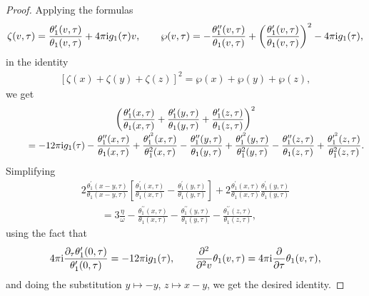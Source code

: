 \documentclass[10pt,a4paper]{amsart}
\numberwithin{equation}{section}
\begin{document}
\begin{proof}
Applying the formulas\vspace{-.5ex}
\begin{gather*}
\zeta(v,\tau)=\frac{\theta_1^{\prime}(v,\tau)}{\theta_1(v,\tau)}+4\pi {\rm i}g_1(\tau)v,\qquad
\wp(v,\tau)=-\frac{\theta_1^{\prime\prime}(v,\tau)}{\theta_1(v,\tau)} +{\left(\frac{\theta_1^{\prime}(v,\tau)}{\theta_1(v,\tau)}\right)}^2-4\pi {\rm i}g_1(\tau),
\end{gather*}
in the identity~\cite{E.T.WhittakerandG.N.Watson}\vspace{-.5ex}
\begin{gather*}
\left[\zeta(x)+\zeta(y)+\zeta(z)\right]^2=\wp(x)+\wp(y)+\wp(z),
\end{gather*}
we get
\begin{gather*}
\left(\frac{\theta_1^{\prime}(x,\tau)}{\theta_1(x,\tau)}+\frac{\theta_1^{\prime}(y,\tau)}{\theta_1(y,\tau)} +\frac{\theta_1^{\prime}(z,\tau)}{\theta_1(z,\tau)}\right)^2
\\[-.5ex] \qquad
{}=-12\pi {\rm i}g_1(\tau)-\frac{\theta_1^{\prime\prime}(x,\tau)}{\theta_1(x,\tau)} +\frac{\theta_1^{\prime^2}(x,\tau)}{\theta_1^2(x,\tau)} -\frac{\theta_1^{\prime\prime}(y,\tau)}{\theta_1(y,\tau)}
+\frac{\theta_1^{\prime^2}(y,\tau)}{\theta_1^2(y,\tau)} -\frac{\theta_1^{\prime\prime}(z,\tau)}{\theta_1(z,\tau)} +\frac{\theta_1^{\prime^2}(z,\tau)}{\theta_1^2(z,\tau)}.
\end{gather*}
Simplifying
\begin{gather*}
2\frac{\theta_1^{\prime}(x-y,\tau)}{\theta_1(x-y,\tau)} \left[\frac{\theta_1^{\prime}(x,\tau)}{\theta_1(x,\tau)} -\frac{\theta_1^{\prime}(y,\tau)}{\theta_1(y,\tau)}\right] +2\frac{\theta_1^{\prime}(x,\tau)}{\theta_1(x,\tau)} \frac{\theta_1^{\prime}(y,\tau)}{\theta_1(y,\tau)}
\\[-.5ex] \qquad
{}=3\frac{\eta}{\omega}-\frac{\theta_1^{\prime\prime}(x,\tau)}{\theta_1(x,\tau)} -\frac{\theta_1^{\prime\prime}(y,\tau)}{\theta_1(y,\tau)} -\frac{\theta_1^{\prime\prime}(z,\tau)}{\theta_1(z,\tau)},
\end{gather*}
using the fact that
\begin{gather}\label{difeqtheta}
4\pi {\rm i}\frac{\partial_{\tau}\theta_1^{\prime}(0,\tau)}{\theta_1^{\prime}(0,\tau)}=-12\pi {\rm i}g_1(\tau),
\qquad
\frac{\partial^2}{\partial^2 v}\theta_1(v,\tau)=4\pi {\rm i}\frac{\partial}{\partial \tau}\theta_1(v,\tau),
\end{gather}
and doing the substitution $y\mapsto -y$, $z\mapsto x-y$, we get the desired identity.
\end{proof}
\end{document}
